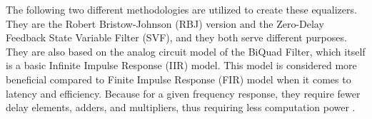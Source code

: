 The following two different methodologies are utilized to create these equalizers. They are the Robert Bristow-Johnson (RBJ) version and 
the Zero-Delay Feedback State Variable Filter (SVF), and they both serve different purposes. They are also based on the analog circuit model 
of the BiQuad Filter, which itself is a basic Infinite Impulse Response (IIR) model. This model is considered more beneficial compared to 
Finite Impulse Response (FIR) model when it comes to latency and efficiency. Because for a given frequency response, they require fewer 
delay elements, adders, and multipliers, thus requiring less computation power \cite{SteveWinder2002C1}.



